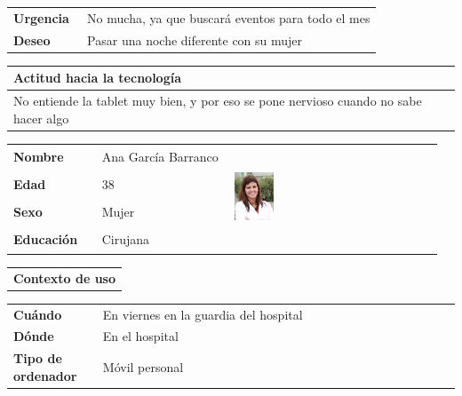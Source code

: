 \documentclass[11pt]{article}
\begin{document}
\begin{table}[H]
  \begin{tabular}{p{0.2\linewidth}|p{0.8\linewidth}}
    \toprule
    \textbf{Urgencia} & No mucha, ya que buscará eventos para todo el mes\\
    \textbf{Deseo}  & Pasar una noche diferente con su mujer \\
    \bottomrule
  \end{tabular}

  \begin{tabular}{p{1.028\linewidth}}
    \textbf{Actitud hacia la tecnología}\\
    \midrule
    No entiende la tablet muy bien, y por eso se pone nervioso cuando no sabe hacer algo
  \end{tabular}
\end{table}

\begin{table}[H]
  \centering
  \begin{tabular}{p{0.2\linewidth}|p{0.3\linewidth}p{0.475\linewidth}}
    \toprule
    \textbf{Nombre} & Ana García Barranco &\multirow{4}{*}{\begin{minipage}{1.\textwidth}\includegraphics[width=0.2\textwidth, height=30mm]{Ana}\end{minipage}}\\
    \textbf{Edad} & 38 & \\
    \textbf{Sexo} & Mujer & \\
    \textbf{Educación} & Cirujana & \\
    \bottomrule
  \end{tabular}

  \begin{tabular}{l}
    \textbf{Contexto de uso} 
  \end{tabular}
  
  \begin{tabular}{p{0.2\linewidth}|p{0.8\linewidth}}
    \toprule
    \textbf{Cuándo} & En viernes en la guardia del hospital\\
    \textbf{Dónde}  & En el hospital\\
    \textbf{Tipo de ordenador} & Móvil personal\\
    \bottomrule
  \end{tabular}


\end{table}
\end{document}
